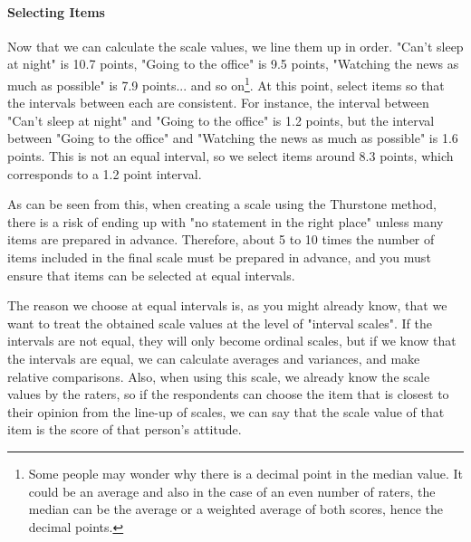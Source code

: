 \documentclass{ltjsbook}
\begin{document}
\paragraph{Selecting Items} Now that we can calculate the scale values, we line them up in order. "Can't sleep at night" is 10.7 points, "Going to the office" is 9.5 points, "Watching the news as much as possible" is 7.9 points... and so on\footnote{Some people may wonder why there is a decimal point in the median value. It could be an average and also in the case of an even number of raters, the median can be the average or a weighted average of both scores, hence the decimal points.}. At this point, select items so that the intervals between each are consistent. For instance, the interval between "Can't sleep at night" and "Going to the office" is 1.2 points, but the interval between "Going to the office" and "Watching the news as much as possible" is 1.6 points. This is not an equal interval, so we select items around 8.3 points, which corresponds to a 1.2 point interval.


As can be seen from this, when creating a scale using the Thurstone method, there is a risk of ending up with "no statement in the right place" unless many items are prepared in advance. Therefore, about 5 to 10 times the number of items included in the final scale must be prepared in advance, and you must ensure that items can be selected at equal intervals.


The reason we choose at equal intervals is, as you might already know, that we want to treat the obtained scale values at the level of "interval scales". If the intervals are not equal, they will only become ordinal scales, but if we know that the intervals are equal, we can calculate averages and variances, and make relative comparisons. Also, when using this scale, we already know the scale values by the raters, so if the respondents can choose the item that is closest to their opinion from the line-up of scales, we can say that the scale value of that item is the score of that person's attitude.
\end{document}
